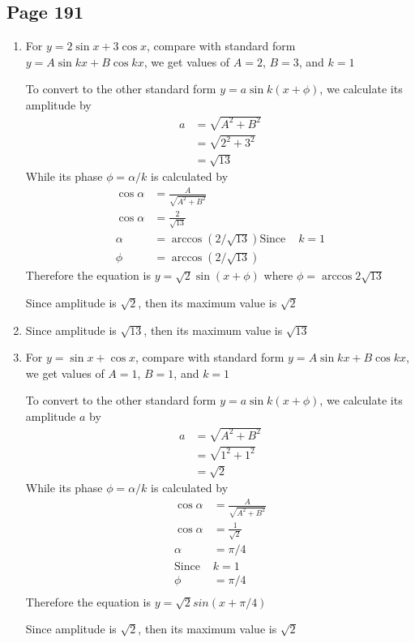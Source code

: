 \documentclass{article}
\newenvironment{solutions}[1]
{\subsection*{#1}
 \begin{enumerate}[leftmargin=1.5em]}
{\end{enumerate}}
\newcommand{\solution}{\item}
\begin{document}
\begin{solutions}{Page 191}
\solution
For $y=2\sin x + 3 \cos x$, compare with standard form $y=A\sin kx + B \cos kx$, we get values of $A=2$, $B=3$, and $k=1$

To convert to the other standard form $y=a\sin k(x+\phi)$, we calculate its amplitude by
\begin{align*}
    a &= \sqrt{A^2+B^2}\\
      &= \sqrt{2^2 + 3^2}\\
      &= \sqrt{13}
\end{align*}
While its phase $\phi=\alpha/k$ is calculated by
\begin{align*}
    \cos \alpha &= \frac{A}{\sqrt{A^2+B^2}}\\
    \cos \alpha &= \frac{2}{\sqrt{13}}\\
    \alpha &= \arccos(2/\sqrt{13})
    \text{Since } & k=1 \\ 
    \phi &= \arccos(2/\sqrt{13})
\end{align*}
Therefore the equation is $y=\sqrt{2}\sin\left(x+\phi\right)$ where $\phi=\arccos{2\sqrt{13}}$

Since amplitude is $\sqrt{2}$, then its maximum value is $\sqrt{2}$

\solution
Since amplitude is $\sqrt{13}$, then its maximum value is $\sqrt{13}$

\solution
For $y=\sin x + \cos x$, compare with standard form $y=A\sin kx + B \cos kx$, we get values of $A=1$, $B=1$, and $k=1$

To convert to the other standard form $y=a\sin k(x+\phi)$, we calculate its amplitude $a$ by
\begin{align*}
    a &= \sqrt{A^2+B^2}\\
      &= \sqrt{1^2 + 1^2}\\
      &= \sqrt{2}
\end{align*}
While its phase $\phi=\alpha/k$ is calculated by
\begin{align*}
    \cos \alpha &= \frac{A}{\sqrt{A^2+B^2}}\\
    \cos \alpha &= \frac{1}{\sqrt{2}}\\
        \alpha &= \pi/4\\
    \text{Since } & k=1 \\ 
        \phi &= \pi/4\\
\end{align*}
Therefore the equation is $y=\sqrt{2}sin\left(x+\pi/4\right)$

Since amplitude is $\sqrt{2}$, then its maximum value is $\sqrt{2}$


\end{solutions}
\end{document}
